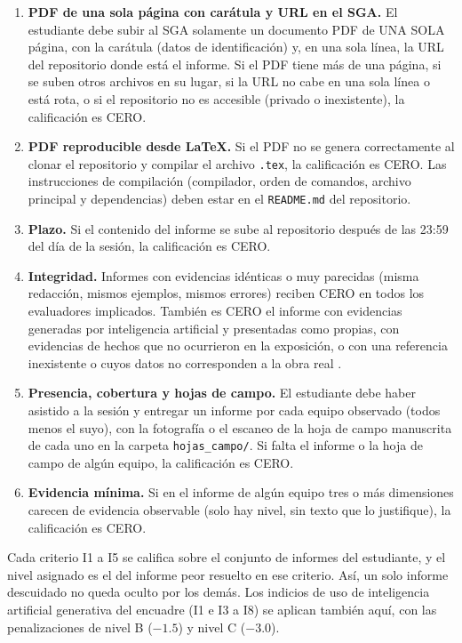 \documentclass[11pt,a4paper]{article}
\begin{document}
\begin{pisoBox}[title={Criterios de piso del informe: su incumplimiento implica calificación CERO}]
	\begin{enumerate}[label=\textbf{P\arabic*.},leftmargin=2.2em]
		\item \textbf{PDF de una sola página con carátula y URL en el SGA.} El estudiante debe subir al SGA solamente un documento PDF de UNA SOLA página, con la carátula (datos de identificación) y, en una sola línea, la URL del repositorio donde está el informe. Si el PDF tiene más de una página, si se suben otros archivos en su lugar, si la URL no cabe en una sola línea o está rota, o si el repositorio no es accesible (privado o inexistente), la calificación es CERO.
		\item \textbf{PDF reproducible desde \LaTeX.} Si el PDF no se genera correctamente al clonar el repositorio y compilar el archivo \texttt{.tex}, la calificación es CERO. Las instrucciones de compilación (compilador, orden de comandos, archivo principal y dependencias) deben estar en el \texttt{README.md} del repositorio.
		\item \textbf{Plazo.} Si el contenido del informe se sube al repositorio después de las 23:59 del día de la sesión, la calificación es CERO.
		\item \textbf{Integridad.} Informes con evidencias idénticas o muy parecidas (misma redacción, mismos ejemplos, mismos errores) reciben CERO en todos los evaluadores implicados. También es CERO el informe con evidencias generadas por inteligencia artificial y presentadas como propias, con evidencias de hechos que no ocurrieron en la exposición, o con una referencia inexistente o cuyos datos no corresponden a la obra real \cite{walters2023fabrication}.
		\item \textbf{Presencia, cobertura y hojas de campo.} El estudiante debe haber asistido a la sesión y entregar un informe por cada equipo observado (todos menos el suyo), con la fotografía o el escaneo de la hoja de campo manuscrita de cada uno en la carpeta \texttt{hojas\_campo/}. Si falta el informe o la hoja de campo de algún equipo, la calificación es CERO.
		\item \textbf{Evidencia mínima.} Si en el informe de algún equipo tres o más dimensiones carecen de evidencia observable (solo hay nivel, sin texto que lo justifique), la calificación es CERO.
	\end{enumerate}
\end{pisoBox}

\begin{avisoBox}[title={Cómo se asigna cada nivel cuando hay varios informes}]
	Cada criterio I1 a I5 se califica sobre el conjunto de informes del estudiante, y el nivel asignado es el del informe peor resuelto en ese criterio. Así, un solo informe descuidado no queda oculto por los demás. Los indicios de uso de inteligencia artificial generativa del encuadre (I1 e I3 a I8) se aplican también aquí, con las penalizaciones de nivel B ($-1.5$) y nivel C ($-3.0$).
\end{avisoBox}
\end{document}
